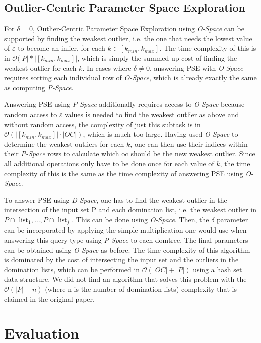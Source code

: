 \documentclass[runningheads]{llncs}
\begin{document}
\subsection{Outlier-Centric Parameter Space Exploration}
 
For $\delta=0$, Outlier-Centric Parameter Space Exploration using \emph{O-Space} can be supported by finding the weakest outlier, i.e. the one that needs the lowest value of $\varepsilon$ to become an inlier, for each $k \in [k_{min},k_{max}]$. The time complexity of this is in $\mathcal{O}(|P| * |[k_{min}, k_{max}]|$, which is simply the summed-up cost of finding the weakest outlier for each $k$. In cases where $\delta \neq 0$, answering PSE with \emph{O-Space} requires sorting each individual row of \emph{O-Space}, which is already exactly the same as computing \emph{P-Space}.

Answering PSE using \emph{P-Space} additionally requires access to \emph{O-Space} because random access to $\varepsilon$ values is needed to find the weakest outlier as above and without random access, the complexity of just this subtask is in $\mathcal{O}(|[k_{min},k_{max}]| \cdot |OC|)$, which is much too large. Having used \emph{O-Space} to determine the weakest outliers for each $k$, one can then use their indices within their \emph{P-Space} rows to calculate which oc should be the new weakest outlier. Since all additional operations only have to be done once for each value of $k$, the time complexity of this is the same as the time complexity of answering PSE using \emph{O-Space}.

To answer PSE using \emph{D-Space}, one has to find the weakest outlier in the intersection of the input set P and each domination list, i.e. the weakest outlier in $P \cap \text{ list}_1, \ldots ,P\cap\text{ list}_j$ . This can be done using \emph{O-Space}. Then, the $\delta$ parameter can be incorporated by applying the simple multiplication one would use when answering this query-type using \emph{P-Space} to each domtree. The final parameters can be obtained using \emph{O-Space} as before. The time complexity of this algorithm is dominated by the cost of intersecting the input set and the outliers in the domination lists, which can be performed in $\mathcal{O}(|OC| + |P|)$ using a hash set data structure. We did not find an algorithm that solves this problem with the $\mathcal{O}(|P| + n)$ (where n is the number of domination lists) complexity that is claimed in the original paper.
\section{Evaluation}
\end{document}
